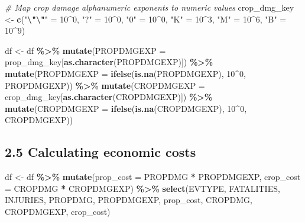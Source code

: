 \documentclass[
]{article}
\newenvironment{Shaded}{\begin{snugshade}}{\end{snugshade}}
\newcommand{\AttributeTok}[1]{\textcolor[rgb]{0.13,0.29,0.53}{#1}}
\newcommand{\CommentTok}[1]{\textcolor[rgb]{0.56,0.35,0.01}{\textit{#1}}}
\newcommand{\DecValTok}[1]{\textcolor[rgb]{0.00,0.00,0.81}{#1}}
\newcommand{\FunctionTok}[1]{\textcolor[rgb]{0.13,0.29,0.53}{\textbf{#1}}}
\newcommand{\NormalTok}[1]{#1}
\newcommand{\OtherTok}[1]{\textcolor[rgb]{0.56,0.35,0.01}{#1}}
\newcommand{\SpecialCharTok}[1]{\textcolor[rgb]{0.81,0.36,0.00}{\textbf{#1}}}
\newcommand{\StringTok}[1]{\textcolor[rgb]{0.31,0.60,0.02}{#1}}
\begin{document}
\begin{Shaded}
\begin{Highlighting}[]
\CommentTok{\# Map crop damage alphanumeric exponents to numeric values}
\NormalTok{crop\_dmg\_key }\OtherTok{\textless{}{-}}  \FunctionTok{c}\NormalTok{(}\StringTok{"}\SpecialCharTok{\textbackslash{}"\textbackslash{}"}\StringTok{"} \OtherTok{=} \DecValTok{10}\SpecialCharTok{\^{}}\DecValTok{0}\NormalTok{,}
                   \StringTok{"?"} \OtherTok{=} \DecValTok{10}\SpecialCharTok{\^{}}\DecValTok{0}\NormalTok{, }
                   \StringTok{"0"} \OtherTok{=} \DecValTok{10}\SpecialCharTok{\^{}}\DecValTok{0}\NormalTok{,}
                   \StringTok{"K"} \OtherTok{=} \DecValTok{10}\SpecialCharTok{\^{}}\DecValTok{3}\NormalTok{,}
                   \StringTok{"M"} \OtherTok{=} \DecValTok{10}\SpecialCharTok{\^{}}\DecValTok{6}\NormalTok{,}
                   \StringTok{"B"} \OtherTok{=} \DecValTok{10}\SpecialCharTok{\^{}}\DecValTok{9}\NormalTok{)}

\NormalTok{df }\OtherTok{\textless{}{-}}\NormalTok{ df }\SpecialCharTok{\%\textgreater{}\%}
  \FunctionTok{mutate}\NormalTok{(}\AttributeTok{PROPDMGEXP =}\NormalTok{ prop\_dmg\_key[}\FunctionTok{as.character}\NormalTok{(PROPDMGEXP)]) }\SpecialCharTok{\%\textgreater{}\%}
  \FunctionTok{mutate}\NormalTok{(}\AttributeTok{PROPDMGEXP =} \FunctionTok{ifelse}\NormalTok{(}\FunctionTok{is.na}\NormalTok{(PROPDMGEXP), }\DecValTok{10}\SpecialCharTok{\^{}}\DecValTok{0}\NormalTok{, PROPDMGEXP)) }\SpecialCharTok{\%\textgreater{}\%}
  \FunctionTok{mutate}\NormalTok{(}\AttributeTok{CROPDMGEXP =}\NormalTok{ crop\_dmg\_key[}\FunctionTok{as.character}\NormalTok{(CROPDMGEXP)]) }\SpecialCharTok{\%\textgreater{}\%}
  \FunctionTok{mutate}\NormalTok{(}\AttributeTok{CROPDMGEXP =} \FunctionTok{ifelse}\NormalTok{(}\FunctionTok{is.na}\NormalTok{(CROPDMGEXP), }\DecValTok{10}\SpecialCharTok{\^{}}\DecValTok{0}\NormalTok{, CROPDMGEXP))}
\end{Highlighting}
\end{Shaded}

\hypertarget{calculating-economic-costs}{%
\subsection{2.5 Calculating economic
costs}\label{calculating-economic-costs}}

\begin{Shaded}
\begin{Highlighting}[]
\NormalTok{df }\OtherTok{\textless{}{-}}\NormalTok{ df }\SpecialCharTok{\%\textgreater{}\%}
    \FunctionTok{mutate}\NormalTok{(}\AttributeTok{prop\_cost =}\NormalTok{ PROPDMG }\SpecialCharTok{*}\NormalTok{ PROPDMGEXP,}
           \AttributeTok{crop\_cost =}\NormalTok{ CROPDMG }\SpecialCharTok{*}\NormalTok{ CROPDMGEXP) }\SpecialCharTok{\%\textgreater{}\%}
    \FunctionTok{select}\NormalTok{(EVTYPE, FATALITIES, INJURIES, PROPDMG, PROPDMGEXP, prop\_cost, }
\NormalTok{           CROPDMG, CROPDMGEXP, crop\_cost)}
\end{Highlighting}
\end{Shaded}
\end{document}
